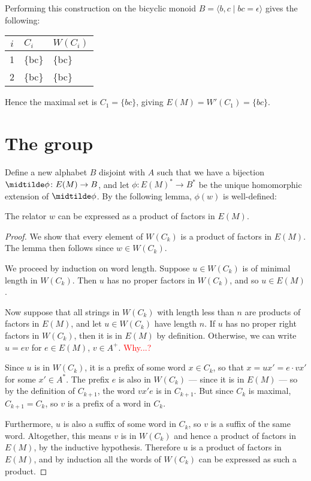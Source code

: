 \documentclass[11pt,libertine,widepage,nosubthm]{lmaths}
\newcommand{\draftnote}[1]{\textcolor{red}{#1}}
\begin{document}
\begin{example}
	Performing this construction on the bicyclic monoid $B = \langle b, c \mid bc = \epsilon \rangle$ gives the following:

	\begin{center}
	\begin{tabular}{c|ll}
		$i$ & $C_i$ & $W(C_i)$ \\
		\hline
		1 & \{bc\} & \{bc\} \\
		2 & \{bc\} & \{bc\}
	\end{tabular}
	\end{center}

	Hence the maximal set is $C_1 = \{bc\}$, giving $E(M) = W'(C_1) = \{ bc \}$.
\end{example}

\section{The group}
Define a new alphabet $B$ disjoint with $A$ such that we have a bijection $\midtilde\phi \colon E(M) \to B$, and let $\phi \colon E(M)^* \to B^*$ be the unique homomorphic extension of $\midtilde\phi$. By the following lemma, $\phi(w)$ is well-defined:

\begin{lemma} \label{lma:relator-factors-E(M)}
	The relator $w$ can be expressed as a product of factors in $E(M)$.
\end{lemma}
\begin{proof}
	\hspace{-0.25mm}We show that every element of $W(C_k)$ is a product of factors in $E(M)$. The lemma then follows since $w \in W(C_k)$.
	
	We proceed by induction on word length. Suppose $u \in W(C_k)$ is of minimal length in $W(C_k)$. Then $u$ has no proper factors in $W(C_k)$, and so $u \in E(M)$.

	Now suppose that all strings in $W(C_k)$ with length less than $n$ are products of factors in $E(M)$, and let $u \in W(C_k)$ have length $n$. If $u$ has no proper right factors in $W(C_k)$, then it is in $E(M)$ by definition. Otherwise, we can write $u = ev$ for $e \in E(M)$, $v \in A^+$. \draftnote{Why...?}

	Since $u$ is in $W(C_k)$, it is a prefix of some word $x \in C_k$, so that $x = ux' = e \cdot vx'$ for some $x' \in A^*$. The prefix $e$ is also in $W(C_k)$ --- since it is in $E(M)$ --- so by the definition of $C_{k+1}$, the word $vx'e$ is in $C_{k+1}$. But since $C_k$ is maximal, $C_{k+1} = C_k$, so $v$ is a prefix of a word in $C_k$.

	Furthermore, $u$ is also a suffix of some word in $C_k$, so $v$ is a suffix of the same word. Altogether, this means $v$ is in $W(C_k)$ and hence a product of factors in $E(M)$, by the inductive hypothesis. Therefore $u$ is a product of factors in $E(M)$, and by induction all the words of $W(C_k)$ can be expressed as such a product.
\end{proof}
\end{document}
